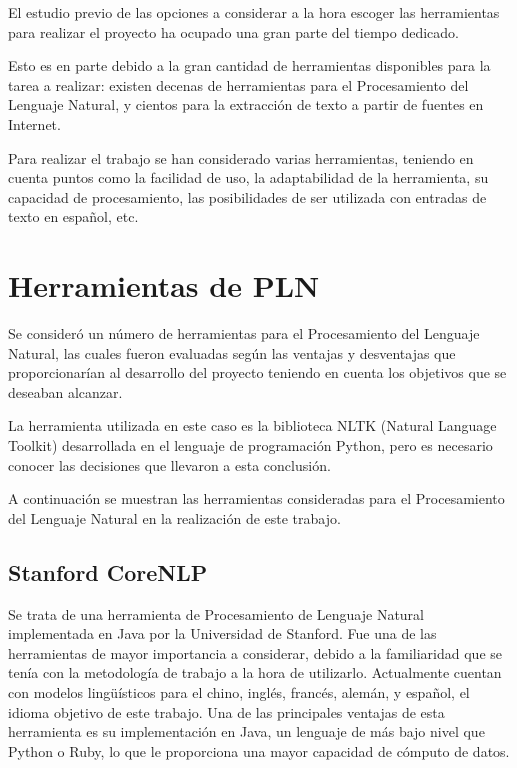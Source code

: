 El estudio previo de las opciones a considerar a la hora escoger las herramientas para realizar el proyecto ha ocupado una gran parte del tiempo dedicado.

Esto es en parte debido a la gran cantidad de herramientas disponibles para la tarea a realizar: existen decenas de herramientas para el Procesamiento del Lenguaje Natural, y cientos para la extracción de texto a partir de fuentes en Internet.

Para realizar el trabajo se han considerado varias herramientas, teniendo en cuenta puntos como la facilidad de uso, la adaptabilidad de la herramienta, su capacidad de procesamiento, las posibilidades de ser utilizada con entradas de texto en español, etc.

\section{Herramientas de PLN}

Se consideró un número de herramientas para el Procesamiento del Lenguaje Natural, las cuales fueron evaluadas según las ventajas y desventajas que proporcionarían al desarrollo del proyecto teniendo en cuenta los objetivos que se deseaban alcanzar.

La herramienta utilizada en este caso es la biblioteca NLTK (Natural Language Toolkit) desarrollada en el lenguaje de programación Python, pero es necesario conocer las decisiones que llevaron a esta conclusión.

A continuación se muestran las herramientas consideradas para el Procesamiento del Lenguaje Natural en la realización de este trabajo.

\subsection{Stanford CoreNLP}

Se trata de una herramienta de Procesamiento de Lenguaje Natural implementada en Java por la Universidad de Stanford.
%
%
Fue una de las herramientas de mayor importancia a considerar, debido a la familiaridad que se tenía con la metodología de trabajo a la hora de utilizarlo.
%
Actualmente cuentan con modelos lingüísticos para el chino, inglés, francés, alemán, y español, el idioma objetivo de este trabajo.
%
Una de las principales ventajas de esta herramienta es su implementación en Java, un lenguaje de más bajo nivel que Python o Ruby, lo que le proporciona una mayor capacidad de cómputo de datos.

